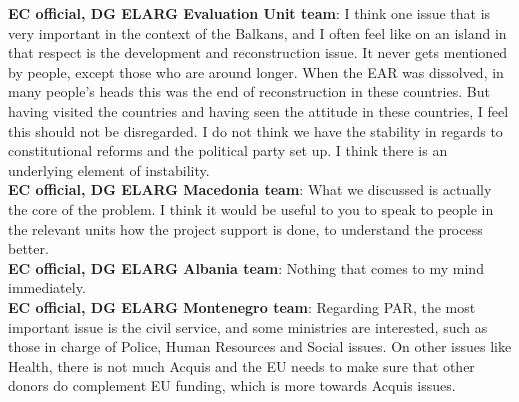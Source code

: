 \textbf{EC official, DG ELARG Evaluation Unit team}: I think one issue that is very important in the context of the Balkans, and I often feel like on an island in that respect is the development and reconstruction issue. It never gets mentioned by people, except those who are around longer. When the EAR was dissolved, in many people's heads this was the end of reconstruction in these countries. But having visited the countries and having seen the attitude in these countries, I feel this should not be disregarded. I do not think we have the stability in regards to constitutional reforms and the political party set up. I think there is an underlying element of instability.\\ 
\textbf{EC official, DG ELARG Macedonia team}: What we discussed is actually the core of the problem. I think it would be useful to you to speak to people in the relevant units how the project support is done, to understand the process better.\\
\textbf{EC official, DG ELARG Albania team}: Nothing that comes to my mind immediately.\\
\textbf{EC official, DG ELARG Montenegro team}: Regarding PAR, the most important issue is the civil service, and some ministries are interested, such as those in charge of Police, Human Resources and Social issues. On other issues like Health, there is not much Acquis and the EU needs to make sure that other donors do complement EU funding, which is more towards Acquis issues. \\
